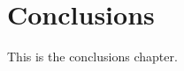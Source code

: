 \documentclass[../main.tex]{subfiles}
\begin{document}
\chapter{Conclusions}

This is the conclusions chapter.
\end{document}
